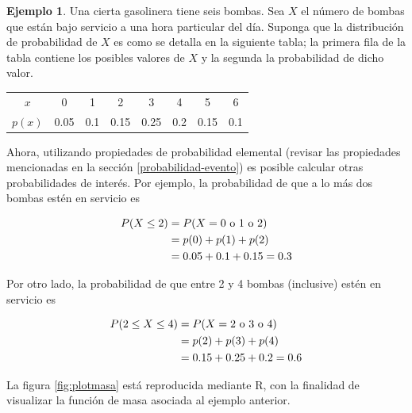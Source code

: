 \documentclass[
  11pt,
]{book}
\theoremstyle{definition}
\theoremstyle{definition}
\newtheorem{example}{Ejemplo}[chapter]
\theoremstyle{definition}
\theoremstyle{definition}
\theoremstyle{remark}
\begin{document}
\begin{example}

Una cierta gasolinera tiene seis bombas. Sea \(X\) el número de bombas que están bajo servicio a una hora particular del día. Suponga que la distribución de probabilidad de \(X\) es como se detalla en la siguiente tabla; la primera fila de la tabla contiene los posibles valores de \(X\) y la segunda la probabilidad de dicho valor.

\begin{table}[H]
\centering
\begin{tabular}[t]{cccccccc}
\toprule
$x$ & 0 & 1 & 2 & 3 & 4 & 5 & 6\\
$p(x)$ & 0.05 & 0.1 & 0.15 & 0.25 & 0.2 & 0.15 & 0.1\\
\bottomrule
\end{tabular}
\end{table}

Ahora, utilizando propiedades de probabilidad elemental (revisar las propiedades mencionadas en la sección \ref{probabilidad-evento}) es posible calcular otras probabilidades de interés. Por ejemplo, la probabilidad de que a lo más dos bombas estén en servicio es

\begin{equation}
  \notag
  \begin{split}
    P(X\leq 2) &= P(X = 0 \text{ o } 1 \text{ o } 2) \\
    & = p(0) + p(1) + p(2) \\
    & = 0.05 + 0.1 + 0.15 = 0.3
  \end{split}
\end{equation}

Por otro lado, la probabilidad de que entre 2 y 4 bombas (inclusive) estén en servicio es

\begin{equation}
  \notag
  \begin{split}
    P(2\leq X\leq 4) &= P(X = 2 \text{ o } 3 \text{ o } 4)\\
    & = p(2) + p(3) + p(4) \\
    & = 0.15 + 0.25 + 0.2 = 0.6
  \end{split}
\end{equation}

\end{example}

La figura \ref{fig:plotmasa} está reproducida mediante R, con la finalidad de visualizar la función de masa asociada al ejemplo anterior.
\end{document}
